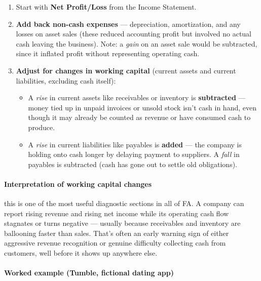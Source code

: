 \documentclass[12pt,openany]{book}
\begin{document}
\begin{enumerate}[leftmargin=*]
    \item Start with \textbf{Net Profit/Loss} from the Income Statement.
    \item \textbf{Add back non-cash expenses} --- depreciation, amortization, and any losses on asset sales (these reduced accounting profit but involved no actual cash leaving the business). Note: a \emph{gain} on an asset sale would be subtracted, since it inflated profit without representing operating cash.
    \item \textbf{Adjust for changes in working capital} (current assets and current liabilities, excluding cash itself):
\begin{itemize}[leftmargin=*]
    \item A \emph{rise} in current assets like receivables or inventory is \textbf{subtracted} --- money tied up in unpaid invoices or unsold stock isn't cash in hand, even though it may already be counted as revenue or have consumed cash to produce.
    \item A \emph{rise} in current liabilities like payables is \textbf{added} --- the company is holding onto cash longer by delaying payment to suppliers. A \emph{fall} in payables is subtracted (cash has gone out to settle old obligations).
\end{itemize}
\end{enumerate}

\paragraph{Interpretation of working capital changes} this is one of the most useful diagnostic sections in all of FA. A company can report rising revenue and rising net income while its operating cash flow stagnates or turns negative --- usually because receivables and inventory are ballooning faster than sales. That's often an early warning sign of either aggressive revenue recognition or genuine difficulty collecting cash from customers, well before it shows up anywhere else.

\paragraph{Worked example (Tumble, fictional dating app)} 
\end{document}
